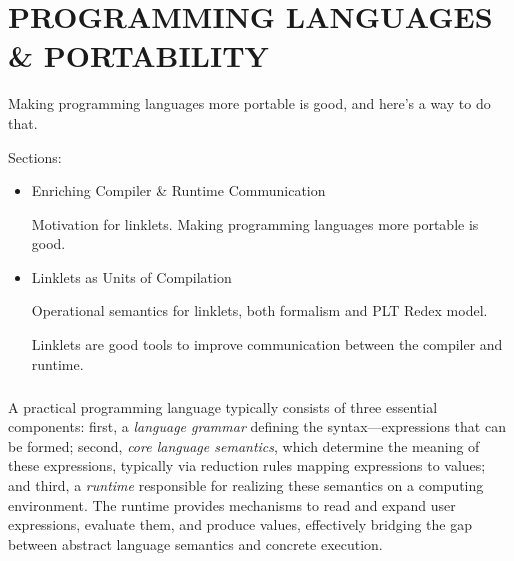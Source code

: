 \chapter[\texorpdfstring{PROGRAMMING LANGUAGES \& PORTABILITY}
                          {Linklets}]{PROGRAMMING LANGUAGES \& PORTABILITY}
\label{chapter:linklets}

	\begin{chaptersynopsis}

        Making programming languages more portable is good, and here's a way to do that.

        \vspace{2em}

        Sections:
		\begin{itemize}
			\item Enriching Compiler \& Runtime Communication

                Motivation for linklets. Making programming languages more portable is good.
			\item Linklets as Units of Compilation

                Operational semantics for linklets, both formalism and PLT Redex model.

				Linklets are good tools to improve communication between the compiler and runtime.
		\end{itemize}
    \end{chaptersynopsis}

	\paragraph{}%
  		A practical programming language typically consists of three essential components: first, a \emph{language grammar} defining the syntax—expressions that can be formed; second, \emph{core language semantics}, which determine the meaning of these expressions, typically via reduction rules mapping expressions to values; and third, a \emph{runtime} responsible for realizing these semantics on a computing environment. The runtime provides mechanisms to read and expand user expressions, evaluate them, and produce values, effectively bridging the gap between abstract language semantics and concrete execution.

